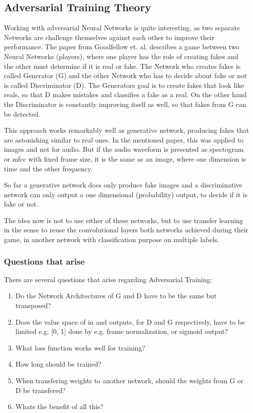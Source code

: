 \subsection{Adversarial Training Theory}\label{sec:adv_theory}
Working with adversarial Neural Networks is quite interesting, as two separate Networks are challenge themselves against each other to improve their performance.
The paper from Goodfellow et. al. \cite{goodfellow2014} describes a game between two Neural Networks (players), where one player has the role of creating fakes and the other must determine if it is real or fake.
The Network who creates fakes is called Generator (G) and the other Network who has to decide about fake or not is called Discriminator (D).
The Generators goal is to create fakes that look like reals, so that D makes mistakes and classifies a fake as a real.
On the other hand the Discriminator is constantly improving itself as well, so that fakes from G can be detected.

This approach works remarkably well as generative network, producing fakes that are astonishing similar to real ones.
In the mentioned paper, this was applied to images and not for audio.
But if the audio waveform is presented as spectogram or mfcc with fixed frame size, it is the same as an image,
where one dimension is time and the other frequency.

So far a generative network does only produce fake images and a discriminative network can only output a one dimensional (probability) output, to decide if it is fake or not.

The idea now is not to use either of these networks, but to use transfer learning in the sense to reuse the convolutional layers both networks achieved during their game, in another network with classification purpose on multiple labels.

\subsubsection{Questions that arise}
There are several questions that arise regarding Adversarial Training:
\begin{enumerate}[label={Q.\textgoth{A}.\arabic*)}, leftmargin=1.4cm]
  \item Do the Network Architectures of G and D have to be the same but transposed?
  \item Does the value space of in and outputs, for D and G respectively, have to be limited e.g. [0, 1] done by e.g. frame normalization, or sigmoid output?
  \item What loss function works well for training?
  \item How long should be trained?
  \item When transfering weights to another network, should the weights from G or D be transfered?
  \item Whats the benefit of all this?
\end{enumerate}

